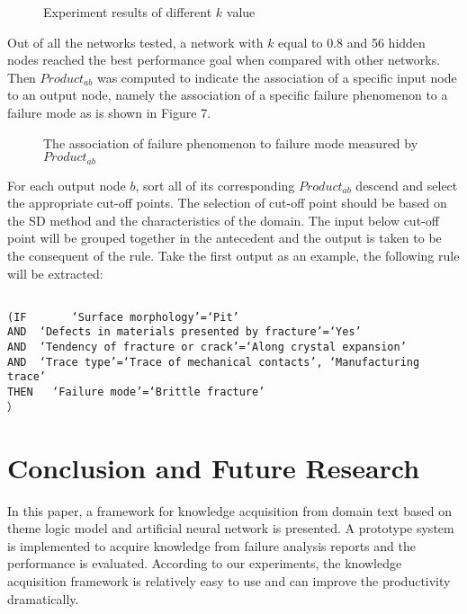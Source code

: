 \documentclass{elsarticle}
\begin{document}
 \begin{figure}[htb]
  \centering
  \caption{Experiment results of different $k$ value}
\label{fig:6}
\end{figure}
 
Out of all the networks tested, a network with $k$ equal to 0.8 and 56
hidden nodes reached the best performance goal when compared with
other networks. Then $Product_{ab}$  was computed to indicate the
association of a specific input node to an output node, namely the
association of a specific failure phenomenon to a failure mode as is
shown in Figure 7. 

 \begin{figure}[htb]
  \centering
  \caption{The association of failure phenomenon to failure mode measured by $Product_{ab}$
}
\label{fig:7}
\end{figure}

For each output node $b$, sort all of its corresponding $Product_{ab}$
descend and select the appropriate cut-off points. The selection of
cut-off point should be based on the SD method and the characteristics
of the domain. The input below cut-off point will be grouped together
in the antecedent and the output is taken to be the consequent of the
rule. Take the first output as an example, the following rule will be
extracted:
\begin{verbatim}

(IF       ‘Surface morphology’=‘Pit’ 
AND  ‘Defects in materials presented by fracture’=‘Yes’
AND  ‘Tendency of fracture or crack’=‘Along crystal expansion’
AND  ‘Trace type’=‘Trace of mechanical contacts’, ‘Manufacturing trace’
THEN   ‘Failure mode’=‘Brittle fracture’
）

\end{verbatim}

\section{Conclusion and Future Research 
}
\label{sec:concl-future-rese}

In this paper, a framework for knowledge acquisition from domain text
based on theme logic model and artificial neural network is
presented. A prototype system is implemented to acquire knowledge from
failure analysis reports and the performance is evaluated. According
to our experiments, the knowledge acquisition framework is relatively
easy to use and can improve the productivity dramatically. 
\end{document}
